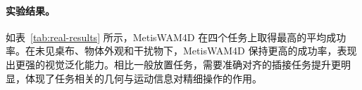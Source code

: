 \paragraph{实验结果。}
如表~\ref{tab:real-results} 所示，MetisWAM4D 在四个任务上取得最高的平均成功率。在未见桌布、物体外观和干扰物下，MetisWAM4D 保持更高的成功率，表现出更强的视觉泛化能力。相比一般放置任务，需要准确对齐的插接任务提升更明显，体现了任务相关的几何与运动信息对精细操作的作用。
